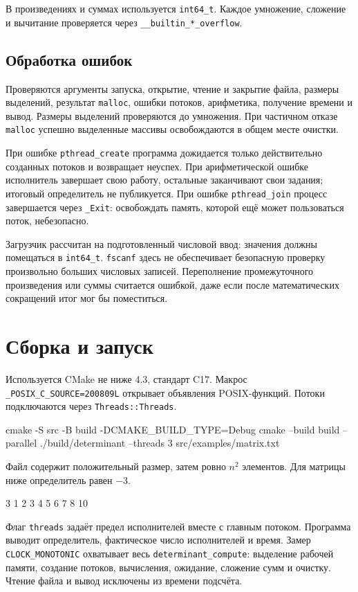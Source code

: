 \documentclass[12pt,a4paper]{article}
\begin{document}
В произведениях и суммах используется \texttt{int64\_t}. Каждое умножение, сложение и вычитание проверяется через \texttt{\_\_builtin\_*\_overflow}.

\subsection{Обработка ошибок}
Проверяются аргументы запуска, открытие, чтение и закрытие файла, размеры выделений, результат \texttt{malloc}, ошибки потоков, арифметика, получение времени и вывод. Размеры выделений проверяются до умножения. При частичном отказе \texttt{malloc} успешно выделенные массивы освобождаются в общем месте очистки.

При ошибке \texttt{pthread\_create} программа дожидается только действительно созданных потоков и возвращает неуспех. При арифметической ошибке исполнитель завершает свою работу, остальные заканчивают свои задания; итоговый определитель не публикуется. При ошибке \texttt{pthread\_join} процесс завершается через \texttt{\_Exit}: освобождать память, которой ещё может пользоваться поток, небезопасно.

Загрузчик рассчитан на подготовленный числовой ввод: значения должны помещаться в \texttt{int64\_t}. \texttt{fscanf} здесь не обеспечивает безопасную проверку произвольно больших числовых записей. Переполнение промежуточного произведения или суммы считается ошибкой, даже если после математических сокращений итог мог бы поместиться.

\section{Сборка и запуск}
Используется CMake не ниже 4.3, стандарт C17. Макрос \texttt{\_POSIX\_C\_SOURCE=200809L} открывает объявления POSIX-функций. Потоки подключаются через \texttt{Threads::Threads}.
\begin{terminal}
cmake -S src -B build -DCMAKE_BUILD_TYPE=Debug
cmake --build build --parallel
./build/determinant --threads 3 src/examples/matrix.txt
\end{terminal}

Файл содержит положительный размер, затем ровно $n^2$ элементов. Для матрицы ниже определитель равен $-3$.
\begin{terminal}
3
1 2 3
4 5 6
7 8 10
\end{terminal}

Флаг \texttt{\-\-threads} задаёт предел исполнителей вместе с главным потоком. Программа выводит определитель, фактическое число исполнителей и время. Замер \texttt{CLOCK\_MONOTONIC} охватывает весь \texttt{determinant\_compute}: выделение рабочей памяти, создание потоков, вычисления, ожидание, сложение сумм и очистку. Чтение файла и вывод исключены из времени подсчёта.
\end{document}
